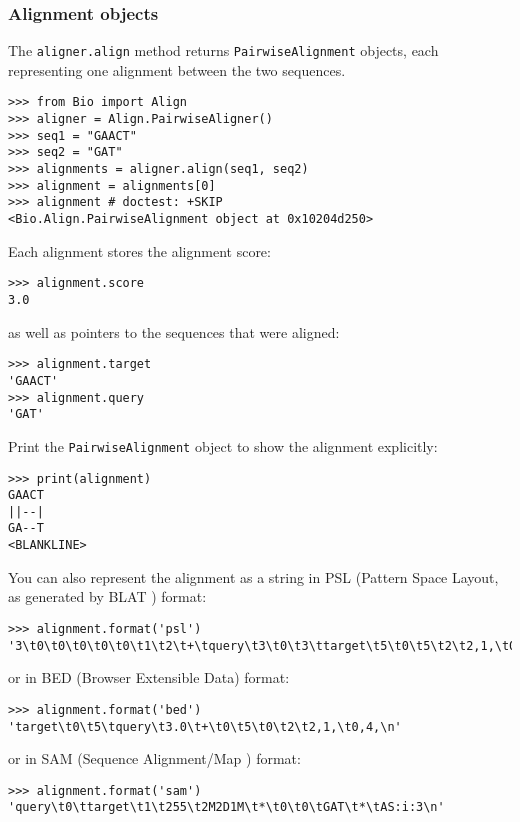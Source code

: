 \subsubsection{Alignment objects}
The \verb+aligner.align+ method returns \verb+PairwiseAlignment+ objects, each representing one alignment between the two sequences.

\begin{verbatim}
>>> from Bio import Align
>>> aligner = Align.PairwiseAligner()
>>> seq1 = "GAACT"
>>> seq2 = "GAT"
>>> alignments = aligner.align(seq1, seq2)
>>> alignment = alignments[0]
>>> alignment # doctest: +SKIP
<Bio.Align.PairwiseAlignment object at 0x10204d250>
\end{verbatim}

Each alignment stores the alignment score:

\begin{verbatim}
>>> alignment.score
3.0
\end{verbatim}
as well as pointers to the sequences that were aligned:

\begin{verbatim}
>>> alignment.target
'GAACT'
>>> alignment.query
'GAT'
\end{verbatim}

Print the \verb+PairwiseAlignment+ object to show the alignment explicitly:

\begin{verbatim}
>>> print(alignment)
GAACT
||--|
GA--T
<BLANKLINE>
\end{verbatim}

You can also represent the alignment as a string in PSL (Pattern Space Layout, as generated by BLAT \cite{kent2002}) format:

\begin{verbatim}
>>> alignment.format('psl')
'3\t0\t0\t0\t0\t0\t1\t2\t+\tquery\t3\t0\t3\ttarget\t5\t0\t5\t2\t2,1,\t0,2,\t0,4,\n'
\end{verbatim}
or in BED (Browser Extensible Data) format:
\begin{verbatim}
>>> alignment.format('bed')
'target\t0\t5\tquery\t3.0\t+\t0\t5\t0\t2\t2,1,\t0,4,\n'
\end{verbatim}
or in SAM (Sequence Alignment/Map \cite{li2009}) format:
\begin{verbatim}
>>> alignment.format('sam')
'query\t0\ttarget\t1\t255\t2M2D1M\t*\t0\t0\tGAT\t*\tAS:i:3\n'
\end{verbatim}

